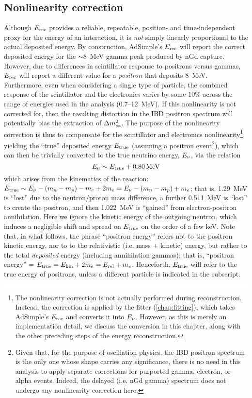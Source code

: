 \documentclass[../thesis.tex]{subfiles}
\begin{document}
\subsection{Nonlinearity correction}
\label{sec:reconEnergyNL}

Although $E_\mathrm{rec}$ provides a reliable, repeatable, position- and time-independent
proxy for the energy of an interaction, it is \emph{not} simply linearly
proportional to the actual deposited energy. By construction, AdSimple's $E_\mathrm{rec}$
will report the correct deposited energy for the $\sim$8~MeV gamma peak produced
by nGd capture. However, due to differences in scintillator response to
positrons versus gammas, $E_\mathrm{rec}$ will report a different value for a
\emph{positron} that deposits 8~MeV. Furthermore, even when considering a single
type of particle, the combined response of the scintillator and the electronics
varies by some 10\% across the range of energies used in the analysis
(0.7--12~MeV). If this nonlinearity is not corrected for, then the resulting
distortion in the IBD positron spectrum will potentially bias the extraction of
$\Delta m^2_{ee}$. The purpose of the nonlinearity correction is thus to compensate for
the scintillator and electronics nonlinearity\footnote{The nonlinearity
  correction is not actually performed during reconstruction. Instead, the
  correction is applied by the fitter (\autoref{chap:fitting}), which takes
  AdSimple's $E_\mathrm{rec}$ and converts it into $E_\mathrm{\nu}$. However, as this is merely an
  implementation detail, we discuss the conversion in this chapter, along with
  the other preceding steps of the energy reconstruction.}, yielding the
``true'' deposited energy $E_\mathrm{true}$ (assuming a positron event\footnote{Given
  that, for the purpose of oscillation physics, the IBD positron spectrum is the
  only one whose shape carries any significance, there is no need in this
  analysis to apply separate corrections for purported gamma, electron, or alpha
  events. Indeed, the delayed (i.e. nGd gamma) spectrum does not undergo any
  nonlinearity correction here.}), which can then be trivially converted to the
true neutrino energy, $E_\mathrm{\nu}$, via the relation
\begin{equation*}
  E_\mathrm{\nu} \sim E_\mathrm{true} + \SI{0.80}{MeV} 
\end{equation*}
which arises from the kinematics of the reaction: $E_\mathrm{true} \sim E_\mathrm{\nu} - (m_n -
m_p) - m_e + 2m_e = E_\mathrm{\nu} - (m_n - m_p) + m_e$; that is, 1.29~MeV is ``lost'' due
to the neutron/proton mass difference, a further 0.511~MeV is ``lost'' to create
the positron, and then 1.022~MeV is ``gained'' from electron-positron
annihilation. Here we ignore the kinetic energy of the outgoing neutron, which
induces a negligible shift and spread on $E_\mathrm{true}$ on the order of a few
keV. Note that, in what follows, the phrase ``positron energy'' refers not to
the positron kinetic energy, nor to to the relativistic (i.e. mass + kinetic)
energy, but rather to the total \emph{deposited} energy (including annihilation
gammas); that is, ``positron energy'' = $E_\mathrm{true} = E_{\mathrm{kin}} + 2m_e =
E_{\mathrm{rel}} + m_e$. Henceforth, $E_\mathrm{true}$ will refer to the true energy of
positrons, unless a different particle is indicated in the subscript.
\end{document}
